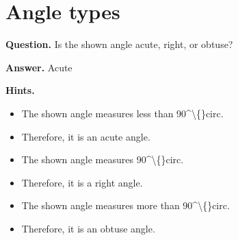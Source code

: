 \documentclass{article}
\begin{document}
\section*{Angle types}
\textbf{Question.} Is the shown angle acute, right, or obtuse?

\textbf{Answer.} Acute

\textbf{Hints.}
\begin{itemize}
  \item The shown angle measures less than 90\textasciicircum{}\textbackslash\{\}circ.
  \item Therefore, it is an acute angle.
  \item The shown angle measures 90\textasciicircum{}\textbackslash\{\}circ.
  \item Therefore, it is a right angle.
  \item The shown angle measures more than 90\textasciicircum{}\textbackslash\{\}circ.
  \item Therefore, it is an obtuse angle.
\end{itemize}
\end{document}

